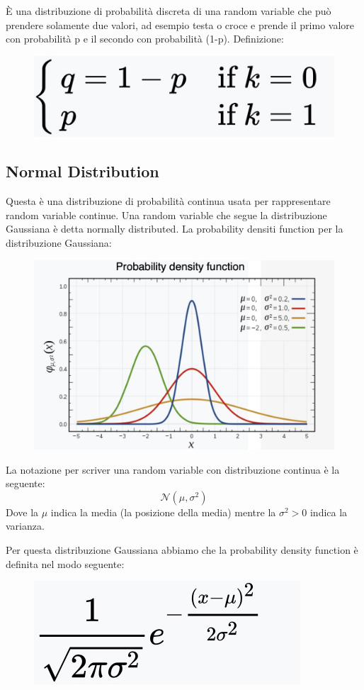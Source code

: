 \documentclass[14pt]{extreport}
\begin{document}
È una distribuzione di probabilità discreta di una random variable che può prendere solamente due valori, ad esempio testa o croce e prende il primo
valore con probabilità p e il secondo con probabilità (1-p). Definizione:

\begin{figure}[H]
	\centering
	\includegraphics[width=0.3\linewidth]{95.jpeg}
\end{figure}

\subsection{Normal Distribution}

Questa è una distribuzione di probabilità continua usata per rappresentare random variable continue. Una random variable che segue la distribuzione
Gaussiana è detta normally distributed. La probability densiti function per la distribuzione Gaussiana:

\begin{figure}[H]
	\centering
	\includegraphics[width=0.5\linewidth]{96.jpeg}
\end{figure}

La notazione per scriver una random variable con distribuzione continua è la seguente: $$\mathcal{N}(\mu, \sigma^2)$$ Dove la $\mu$ indica la media
(la posizione della media) mentre la $\sigma^2>0$ indica la varianza.

Per questa distribuzione Gaussiana abbiamo che la probability density function è definita nel modo seguente:

\begin{figure}[H]
	\centering
	\includegraphics[width=0.3\linewidth]{97.jpeg}
\end{figure}
\end{document}
